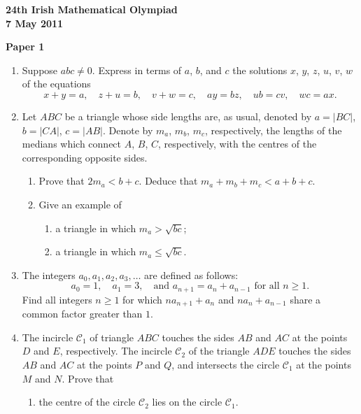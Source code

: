 \documentclass[12pt]{article}
\begin{document}
\begin{center}
{\large\bfseries 24th Irish Mathematical Olympiad\\7 May 2011}
\end{center}
\bigskip\noindent\textbf{Paper 1}\bigskip
\begin{enumerate}
\item Suppose $abc \ne 0$. Express in terms of $a$, $b$, and $c$ the solutions $x$, $y$, $z$, $u$, $v$, $w$ of the equations
\[
x + y = a, \quad z + u = b, \quad v + w = c, \quad ay = bz, \quad ub = cv, \quad wc = ax.
\]

\item Let $ABC$ be a triangle whose side lengths are, as usual, denoted by $a = |BC|$, $b = |CA|$, $c = |AB|$. Denote by $m_a$, $m_b$, $m_c$, respectively, the lengths of the medians which connect $A$, $B$, $C$, respectively, with the centres of the corresponding opposite sides.

\begin{enumerate}
\item Prove that $2m_a < b + c$. Deduce that $m_a + m_b + m_c < a + b + c$.

\item Give an example of
\begin{enumerate}
\item[(i)] a triangle in which $m_a > \sqrt{bc}$;
\item[(ii)] a triangle in which $m_a \le \sqrt{bc}$.
\end{enumerate}
\end{enumerate}

\item The integers $a_0, a_1, a_2, a_3, \ldots$ are defined as follows:
\[
a_0 = 1, \quad a_1 = 3, \quad \text{and } a_{n+1} = a_n + a_{n-1} \text{ for all } n \ge 1.
\]
Find all integers $n \ge 1$ for which $na_{n+1} + a_n$ and $na_n + a_{n-1}$ share a common factor greater than $1$.

\item The incircle $\mathcal{C}_1$ of triangle $ABC$ touches the sides $AB$ and $AC$ at the points $D$ and $E$, respectively. The incircle $\mathcal{C}_2$ of the triangle $ADE$ touches the sides $AB$ and $AC$ at the points $P$ and $Q$, and intersects the circle $\mathcal{C}_1$ at the points $M$ and $N$. Prove that

\begin{enumerate}
\item the centre of the circle $\mathcal{C}_2$ lies on the circle $\mathcal{C}_1$.


\end{enumerate}
\end{enumerate}
\end{document}
